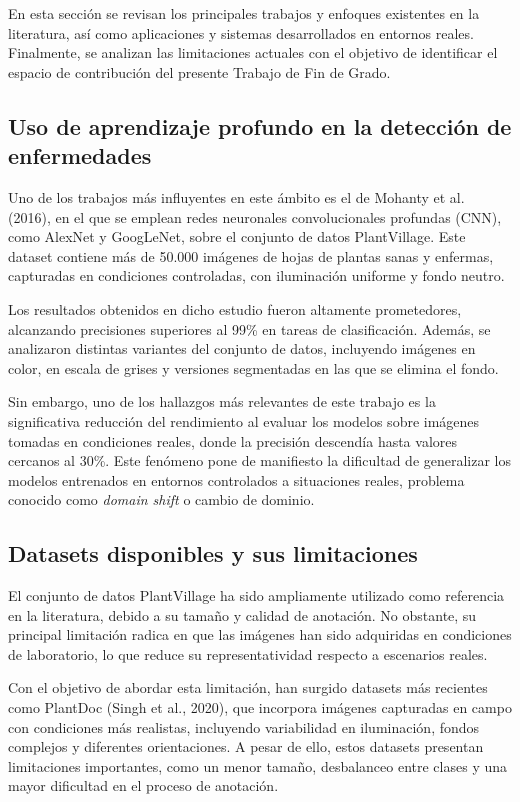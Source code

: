 \documentclass[12pt,a4paper]{article}
\begin{document}
En esta sección se revisan los principales trabajos y enfoques existentes en la literatura, así como aplicaciones y sistemas desarrollados en entornos reales. Finalmente, se analizan las limitaciones actuales con el objetivo de identificar el espacio de contribución del presente Trabajo de Fin de Grado.

\subsection{Uso de aprendizaje profundo en la detección de enfermedades}

Uno de los trabajos más influyentes en este ámbito es el de Mohanty et al. (2016), en el que se emplean redes neuronales convolucionales profundas (CNN), como AlexNet y GoogLeNet, sobre el conjunto de datos PlantVillage. Este dataset contiene más de 50.000 imágenes de hojas de plantas sanas y enfermas, capturadas en condiciones controladas, con iluminación uniforme y fondo neutro.

Los resultados obtenidos en dicho estudio fueron altamente prometedores, alcanzando precisiones superiores al 99\% en tareas de clasificación. Además, se analizaron distintas variantes del conjunto de datos, incluyendo imágenes en color, en escala de grises y versiones segmentadas en las que se elimina el fondo.

Sin embargo, uno de los hallazgos más relevantes de este trabajo es la significativa reducción del rendimiento al evaluar los modelos sobre imágenes tomadas en condiciones reales, donde la precisión descendía hasta valores cercanos al 30\%. Este fenómeno pone de manifiesto la dificultad de generalizar los modelos entrenados en entornos controlados a situaciones reales, problema conocido como \textit{domain shift} o cambio de dominio.

\subsection{Datasets disponibles y sus limitaciones}

El conjunto de datos PlantVillage ha sido ampliamente utilizado como referencia en la literatura, debido a su tamaño y calidad de anotación. No obstante, su principal limitación radica en que las imágenes han sido adquiridas en condiciones de laboratorio, lo que reduce su representatividad respecto a escenarios reales.

Con el objetivo de abordar esta limitación, han surgido datasets más recientes como PlantDoc (Singh et al., 2020), que incorpora imágenes capturadas en campo con condiciones más realistas, incluyendo variabilidad en iluminación, fondos complejos y diferentes orientaciones. A pesar de ello, estos datasets presentan limitaciones importantes, como un menor tamaño, desbalanceo entre clases y una mayor dificultad en el proceso de anotación.
\end{document}
